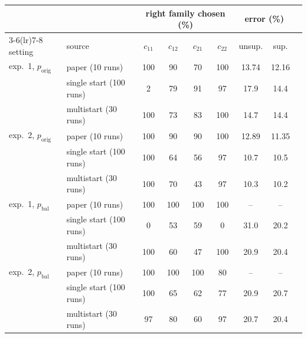 \begin{tabular}{llccccccc}
\toprule
 & & \multicolumn{4}{c}{right family chosen (\%)} & \multicolumn{2}{c}{error (\%)} \\
\cmidrule(lr){3-6}\cmidrule(lr){7-8}
setting & source & $c_{11}$ & $c_{12}$ & $c_{21}$ & $c_{22}$ & unsup. & sup. \\
\midrule
exp.~1, $p_{\text{orig}}$ & paper (10 runs) & 100 & 90 & 70 & 100 & 13.74 & 12.16 \\
 & single start (100 runs) & 2 & 79 & 91 & 97 & 17.9 & 14.4 \\
 & multistart (30 runs) & 100 & 73 & 83 & 100 & 14.7 & 14.4 \\
\addlinespace
exp.~2, $p_{\text{orig}}$ & paper (10 runs) & 100 & 90 & 90 & 100 & 12.89 & 11.35 \\
 & single start (100 runs) & 100 & 64 & 56 & 97 & 10.7 & 10.5 \\
 & multistart (30 runs) & 100 & 70 & 43 & 97 & 10.3 & 10.2 \\
\addlinespace
exp.~1, $p_{\text{bal}}$ & paper (10 runs) & 100 & 100 & 100 & 100 & -- & -- \\
 & single start (100 runs) & 0 & 53 & 59 & 0 & 31.0 & 20.2 \\
 & multistart (30 runs) & 100 & 60 & 47 & 100 & 20.9 & 20.4 \\
\addlinespace
exp.~2, $p_{\text{bal}}$ & paper (10 runs) & 100 & 100 & 100 & 80 & -- & -- \\
 & single start (100 runs) & 100 & 65 & 62 & 77 & 20.9 & 20.7 \\
 & multistart (30 runs) & 97 & 80 & 60 & 97 & 20.7 & 20.4 \\
\bottomrule
\end{tabular}
